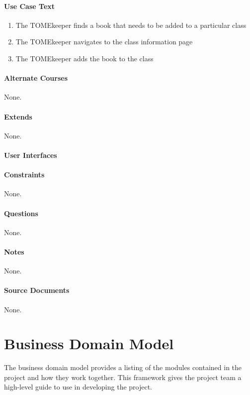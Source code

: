 \documentclass[12pt,titlepage]{article}
\begin{document}
\paragraph{Use Case Text}
\begin{enumerate}
	\item The TOMEkeeper finds a book that needs to be added to a particular class
	\item The TOMEkeeper navigates to the class information page
	\item The TOMEkeeper adds the book to the class
\end{enumerate}
\paragraph{Alternate Courses}
None.
\paragraph{Extends}
None.
\paragraph{User Interfaces}
\paragraph{Constraints}
None.
\paragraph{Questions}
None.
\paragraph{Notes}
None.
\paragraph{Source Documents}
None.

\section{Business Domain Model}
The business domain model provides a listing of the modules contained in the project and how they work together.  This framework gives the project team a high-level guide to use in developing the project.
\end{document}
